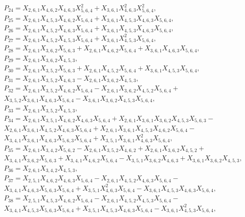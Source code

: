 \documentclass[10pt]{beamer}
\begin{document}
{$P_{24}=X_{2,6,1}X_{4,6,2}X_{4,6,3}X_{5,6,4}^2+X_{3,6,1}X_{4,6,3}^2X_{5,6,4}^2,$\\
$P_{25}=X_{2,6,1}X_{4,5,3}X_{4,6,2}X_{5,6,4}+X_{3,6,1}X_{4,5,3}X_{4,6,3}X_{5,6,4},$\\
$P_{26}=X_{2,6,1}X_{4,5,2}X_{4,6,3}X_{5,6,4}+X_{3,6,1}X_{4,5,3}X_{4,6,3}X_{5,6,4},$\\
$P_{27}=X_{2,6,1}X_{4,5,2}X_{4,5,3}X_{5,6,4}+X_{3,6,1}X_{4,5,3}^2X_{5,6,4},$\\
$P_{28}=X_{2,6,1}X_{3,6,2}X_{5,6,3}+X_{2,6,1}X_{4,6,2}X_{5,6,4}+X_{3,6,1}X_{4,6,3}X_{5,6,4},$\\
$P_{29}=X_{2,6,1}X_{3,6,2}X_{4,5,3},$\\
$P_{30}=X_{2,6,1}X_{3,5,2}X_{5,6,3}+X_{2,6,1}X_{4,5,2}X_{5,6,4}+X_{3,6,1}X_{4,5,3}X_{5,6,4},$\\
$P_{31}=X_{2,6,1}X_{3,5,2}X_{4,6,3}-X_{2,6,1}X_{3,6,2}X_{4,5,3},$\\
$P_{32}=X_{2,6,1}X_{3,5,2}X_{4,6,2}X_{5,6,4}-X_{2,6,1}X_{3,6,2}X_{4,5,2}X_{5,6,4}+$\\
$X_{3,5,2}X_{3,6,1}X_{4,6,3}X_{5,6,4}-X_{3,6,1}X_{3,6,2}X_{4,5,3}X_{5,6,4},$\\
$P_{33}=X_{2,6,1}X_{3,5,2}X_{4,5,3},$\\
$P_{34}=X_{2,6,1}X_{3,5,1}X_{4,6,2}X_{4,6,3}X_{5,6,4}+X_{2,6,1}X_{3,6,1}X_{3,6,2}X_{4,5,3}X_{5,6,3}-$\\
$X_{2,6,1}X_{3,6,1}X_{4,5,2}X_{4,6,3}X_{5,6,4}+X_{2,6,1}X_{3,6,1}X_{4,5,3}X_{4,6,2}X_{5,6,4}-$\\
$X_{3,4,1}X_{3,6,1}X_{4,6,3}X_{5,6,3}X_{5,6,4}+X_{3,5,1}X_{3,6,1}X_{4,6,3}^2X_{5,6,4},$\\
$P_{35}=X_{2,6,1}X_{3,4,2}X_{5,6,2}-X_{2,6,1}X_{3,5,2}X_{4,6,2}+X_{2,6,1}X_{3,6,2}X_{4,5,2}+$\\
$X_{3,4,1}X_{3,6,2}X_{5,6,3}+X_{3,4,1}X_{4,6,2}X_{5,6,4}-X_{3,5,1}X_{3,6,2}X_{4,6,3}+X_{3,6,1}X_{3,6,2}X_{4,5,3},$\\
$P_{36}=X_{2,6,1}X_{3,4,2}X_{4,5,3},$\\
$P_{37}=X_{2,5,1}X_{4,6,2}X_{4,6,3}X_{5,6,4}-X_{2,6,1}X_{4,5,2}X_{4,6,3}X_{5,6,4}-$\\
$X_{3,4,1}X_{4,6,3}X_{5,6,3}X_{5,6,4}+X_{3,5,1}X_{4,6,3}^2X_{5,6,4}-X_{3,6,1}X_{4,5,3}X_{4,6,3}X_{5,6,4},$\\
$P_{38}=X_{2,5,1}X_{4,5,3}X_{4,6,2}X_{5,6,4}-X_{2,6,1}X_{4,5,2}X_{4,5,3}X_{5,6,4}-$\\
$X_{3,4,1}X_{4,5,3}X_{5,6,3}X_{5,6,4}+X_{3,5,1}X_{4,5,3}X_{4,6,3}X_{5,6,4}-X_{3,6,1}X_{4,5,3}^2X_{5,6,4},$\\
}
\end{document}
